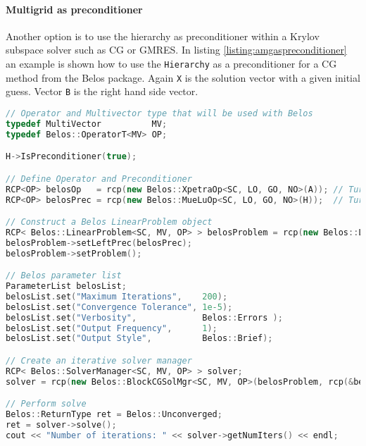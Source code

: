 \paragraph{Multigrid as preconditioner}
Another option is to use the \MueLu hierarchy as preconditioner within a Krylov subspace solver such as CG or GMRES. In listing \ref{listing:amgaspreconditioner} an example is shown how to use the \verb|Hierarchy| as a preconditioner for a CG method from the Belos package.
Again \verb|X| is the solution vector with a given initial guess. Vector \verb|B| is the right hand side vector.
\begin{Listing}
\begin{center}
\begin{lstlisting}[language=C++,label=listing:AmgAsPreconditioner]
// Operator and Multivector type that will be used with Belos
typedef MultiVector          MV;
typedef Belos::OperatorT<MV> OP;

H->IsPreconditioner(true);

// Define Operator and Preconditioner
RCP<OP> belosOp   = rcp(new Belos::XpetraOp<SC, LO, GO, NO>(A)); // Turns a Xpetra::Matrix object into a Belos operator
RCP<OP> belosPrec = rcp(new Belos::MueLuOp<SC, LO, GO, NO>(H));  // Turns a MueLu::Hierarchy object into a Belos operator

// Construct a Belos LinearProblem object
RCP< Belos::LinearProblem<SC, MV, OP> > belosProblem = rcp(new Belos::LinearProblem<SC, MV, OP>(belosOp, X, B));
belosProblem->setLeftPrec(belosPrec);
belosProblem->setProblem();

// Belos parameter list
ParameterList belosList;
belosList.set("Maximum Iterations",    200);
belosList.set("Convergence Tolerance", 1e-5);
belosList.set("Verbosity",             Belos::Errors );
belosList.set("Output Frequency",      1);
belosList.set("Output Style",          Belos::Brief);

// Create an iterative solver manager
RCP< Belos::SolverManager<SC, MV, OP> > solver;
solver = rcp(new Belos::BlockCGSolMgr<SC, MV, OP>(belosProblem, rcp(&belosList, false)));

// Perform solve
Belos::ReturnType ret = Belos::Unconverged;
ret = solver->solve();
cout << "Number of iterations: " << solver->getNumIters() << endl;
\end{lstlisting}
\caption{Use AMG as preconditioner within Belos.}
\label{listing:amgaspreconditioner}
\end{center}
\end{Listing}


